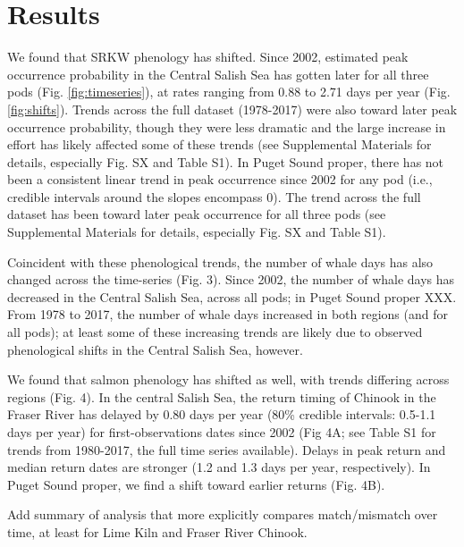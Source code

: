 \documentclass{article}
\begin{document}
\section*{Results}
\par We found that SRKW phenology has shifted. Since 2002, estimated peak occurrence probability in the Central Salish Sea has gotten later for all three pods (Fig. \ref{fig:timeseries}), at rates ranging from 0.88  to 2.71 days per year (Fig. \ref{fig:shifts}). Trends across the full dataset (1978-2017) were also toward later peak occurrence probability, though they were less dramatic and the large increase in effort has likely affected some of these trends (see Supplemental Materials for details, especially Fig. SX and Table S1).  In Puget Sound proper, there has not been a consistent linear trend in peak occurrence since 2002 for any pod (i.e., credible intervals around the slopes encompass 0). The trend across the full dataset has been toward later peak occurrence for all three pods (see Supplemental Materials for details, especially Fig. SX and Table S1). 
\par Coincident with these phenological trends, the number of whale days has also changed across the time-series (Fig. 3). Since 2002, the number of whale days has decreased in the Central Salish Sea, across all pods; in Puget Sound proper XXX. From 1978 to 2017, the number of whale days increased in both regions (and for all pods); at least some of these increasing trends are likely due to observed phenological shifts in the Central Salish Sea, however. 
\par We found that salmon phenology has shifted as well, with trends differing across regions (Fig. 4). In the central Salish Sea, the return timing of Chinook in the Fraser River has delayed by 0.80 days per year (80\% credible intervals: 0.5-1.1 days per year) for first-observations dates since 2002 (Fig 4A; see Table S1 for trends from 1980-2017, the full time series available).  Delays in peak return and median return dates are stronger (1.2 and 1.3 days per year, respectively). In Puget Sound proper, we find a shift toward earlier returns (Fig. 4B).

\par Add summary of analysis that more explicitly compares match/mismatch over time, at least for Lime Kiln and Fraser River Chinook.
\end{document}
